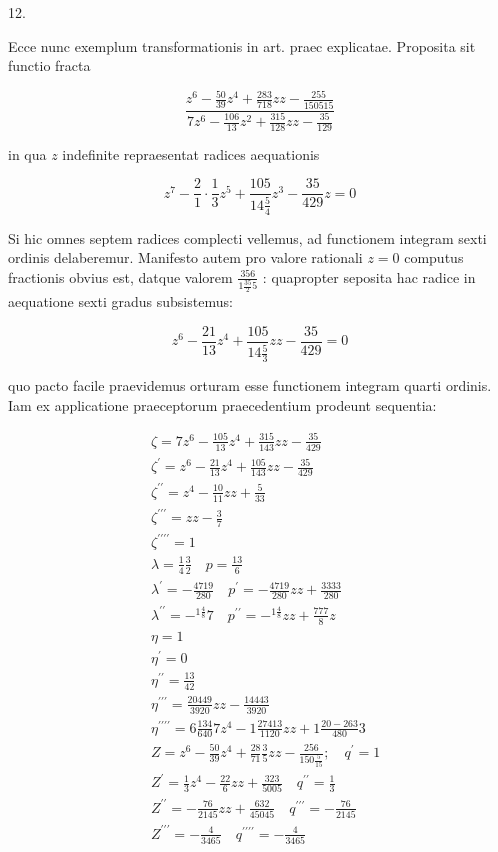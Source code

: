 \documentclass[10pt]{article}
\begin{document}
12.

Ecce nunc exemplum transformationis in art. praec explicatae. Proposita sit functio fracta

\[
\frac{z^{6}-\frac{50}{39} z^{4}+\frac{283}{718} z z-\frac{255}{150515}}{7 z^{6}-\frac{106}{13} z^{2}+\frac{315}{128} z z-\frac{35}{129}}
\]

in qua \(z\) indefinite repraesentat radices aequationis

\[
z^{7}-\frac{2}{1} \cdot \frac{1}{3} z^{5}+\frac{105}{14 \frac{5}{4}} z^{3}-\frac{35}{429} z=0
\]

Si hic omnes septem radices complecti vellemus, ad functionem integram sexti ordinis delaberemur. Manifesto autem pro valore rationali \(z=0\) computus fractionis obvius est, datque valorem \(\frac{356}{1 \frac{35}{2} 5}\) : quapropter seposita hac radice in aequatione sexti gradus subsistemus:

\[
z^{6}-\frac{21}{13} z^{4}+\frac{105}{14 \frac{5}{3}} z z-\frac{35}{429}=0
\]

quo pacto facile praevidemus orturam esse functionem integram quarti ordinis. Iam ex applicatione praeceptorum praecedentium prodeunt sequentia:

\[
\begin{aligned}
& \zeta=7 z^{6}-\frac{105}{13} z^{4}+\frac{315}{143} z z-\frac{35}{429} \\
& \zeta^{\prime}=z^{6}-\frac{21}{13} z^{4}+\frac{105}{143} z z-\frac{35}{429} \\
& \zeta^{\prime \prime}=z^{4}-\frac{10}{11} z z+\frac{5}{33} \\
& \zeta^{\prime \prime \prime}=z z-\frac{3}{7} \\
& \zeta^{\prime \prime \prime \prime}=1 \\
& \lambda=\frac{1}{4} \frac{3}{2} \quad p=\frac{13}{6} \\
& \lambda^{\prime}=-\frac{4719}{280} \quad p^{\prime}=-\frac{4719}{280} z z+\frac{3333}{280} \\
& \lambda^{\prime \prime}=-{ }^{1 \frac{4}{8}} 7 \quad p^{\prime \prime}=-{ }^{1 \frac{4}{8}} z z+\frac{777}{8} z \\
& \eta=1 \\
& \eta^{\prime}=0 \\
& \eta^{\prime \prime}=\frac{13}{42} \\
& \eta^{\prime \prime \prime}=\frac{20449}{3920} z z-\frac{14443}{3920} \\
& \eta^{\prime \prime \prime \prime}=6 \frac{134}{640} 7 z^{4}-1 \frac{27413}{1120} z z+1 \frac{20-263}{480} 3 \\
& Z=z^{6}-\frac{50}{39} z^{4}+\frac{28}{71} \frac{3}{5} z z-\frac{256}{150 \frac{5}{15}} ; \quad q^{\prime}=1 \\
& Z^{\prime}=\frac{1}{3} z^{4}-\frac{22}{6} z z+\frac{323}{5005} \quad q^{\prime \prime}=\frac{1}{3} \\
& Z^{\prime \prime}=-\frac{76}{2145} z z+\frac{632}{45045} \quad q^{\prime \prime \prime}=-\frac{76}{2145} \\
& Z^{\prime \prime \prime}=-\frac{4}{3465} \quad q^{\prime \prime \prime \prime}=-\frac{4}{3465}
\end{aligned}
\]
\end{document}
